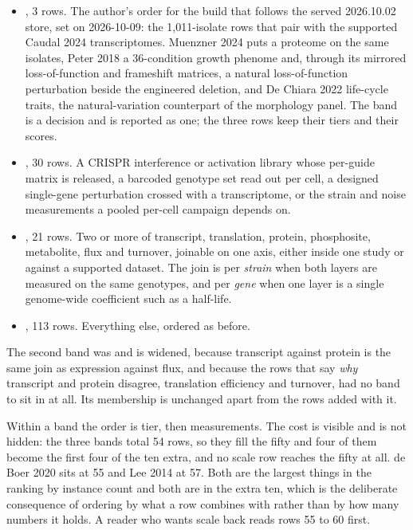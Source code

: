 \begin{itemize}[leftmargin=1.2em,itemsep=1pt,topsep=2pt]
  \item {}, 3 rows. The author's order for the build that follows the
    served 2026.10.02 store, set on 2026-10-09: the 1,011-isolate rows that pair with the
    supported Caudal 2024 transcriptomes. Muenzner 2024 puts a proteome on the same
    isolates, Peter 2018 a 36-condition growth phenome and, through its mirrored
    loss-of-function and frameshift matrices, a natural loss-of-function perturbation
    beside the engineered deletion, and De Chiara 2022 life-cycle traits, the
    natural-variation counterpart of the morphology panel. The band is a decision and is
    reported as one; the three rows keep their tiers and their scores.
  \item {}, 30 rows. A CRISPR interference or activation library whose
    per-guide matrix is released, a barcoded genotype set read out per cell, a designed
    single-gene perturbation crossed with a transcriptome, or the strain and noise
    measurements a pooled per-cell campaign depends on.
  \item {}, 21 rows. Two or more of transcript, translation,
    protein, phosphosite, metabolite, flux and turnover, joinable on one axis, either
    inside one study or against a supported dataset. The join is per \emph{strain} when
    both layers are measured on the same genotypes, and per \emph{gene} when one layer is
    a single genome-wide coefficient such as a half-life.
  \item {}, 113 rows. Everything else, ordered as before.
\end{itemize}

The second band was  and is widened, because transcript
against protein is the same join as expression against flux, and because the rows that say
\emph{why} transcript and protein disagree, translation efficiency and turnover, had no
band to sit in at all. Its membership is unchanged apart from the rows added with it.

Within a band the order is tier, then measurements. The cost is visible and is not hidden:
the three bands total 54 rows, so they fill the fifty and four of them become the first
four of the ten extra, and no scale row reaches the fifty at all. de Boer 2020 sits at 55
and Lee 2014 at 57. Both are the largest things in the ranking by instance count and both
are in the extra ten, which is the deliberate consequence of ordering by what a row
combines with rather than by how many numbers it holds. A reader who wants scale back
reads rows 55 to 60 first.

